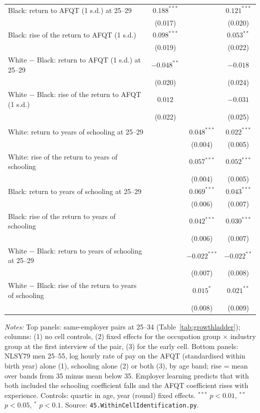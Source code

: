 \begin{table}[!htbp]
{{\begin{tabular}{lccc}
Black: return to AFQT (1 s.d.) at 25--29 & $0.188^{***}$ &  & $0.121^{***}$ \\
 & (0.017) &  & (0.020) \\
Black: rise of the return to AFQT (1 s.d.) & $0.098^{***}$ &  & $0.053^{**}$ \\
 & (0.019) &  & (0.022) \\
White $-$ Black: return to AFQT (1 s.d.) at 25--29 & $-0.048^{**}$ &  & $-0.018$ \\
 & (0.020) &  & (0.024) \\
White $-$ Black: rise of the return to AFQT (1 s.d.) & $0.012$ &  & $-0.031$ \\
 & (0.022) &  & (0.025) \\
\addlinespace
\multicolumn{4}{l}{\textit{NLSY79: log hourly rate of pay on years of schooling, by age}} \\
White: return to years of schooling at 25--29 &  & $0.048^{***}$ & $0.022^{***}$ \\
 &  & (0.004) & (0.005) \\
White: rise of the return to years of schooling &  & $0.057^{***}$ & $0.052^{***}$ \\
 &  & (0.004) & (0.005) \\
Black: return to years of schooling at 25--29 &  & $0.069^{***}$ & $0.043^{***}$ \\
 &  & (0.006) & (0.007) \\
Black: rise of the return to years of schooling &  & $0.042^{***}$ & $0.030^{***}$ \\
 &  & (0.006) & (0.007) \\
White $-$ Black: return to years of schooling at 25--29 &  & $-0.022^{***}$ & $-0.022^{**}$ \\
 &  & (0.007) & (0.008) \\
White $-$ Black: rise of the return to years of schooling &  & $0.015^{*}$ & $0.021^{**}$ \\
 &  & (0.008) & (0.009) \\
\bottomrule
\end{tabular}}}
\par\smallskip
\begin{minipage}{\textwidth}\footnotesize \textit{Notes:} Top panels: same-employer pairs at 25--34 (Table~\ref{tab:growthladder}); columns: (1) no cell controls, (2) fixed effects for the occupation group $\times$ industry group at the first interview of the pair, (3) for the early cell. Bottom panels: NLSY79 men 25--55, log hourly rate of pay on the AFQT (standardised within birth year) alone (1), schooling alone (2) or both (3), by age band; rise = mean over bands from 35 minus mean below 35. Employer learning predicts that with both included the schooling coefficient falls and the AFQT coefficient rises with experience. Controls: quartic in age, year (round) fixed effects. $^{***}$ $p<0.01$, $^{**}$ $p<0.05$, $^{*}$ $p<0.1$. Source: \texttt{45.WithinCellIdentification.py}.\end{minipage}
\end{table}
